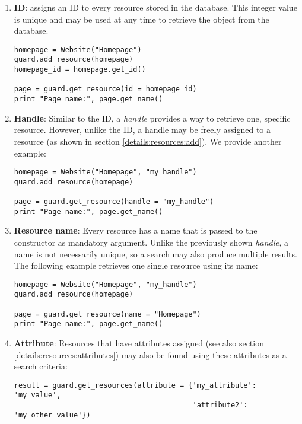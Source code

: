 \begin{enumerate}
\item {\bf ID}: \product assigns an ID to every resource stored in the 
database. This integer value is unique and may be used at any time to 
retrieve the object from the database.

\begin{lstlisting}
homepage = Website("Homepage")
guard.add_resource(homepage)
homepage_id = homepage.get_id()

page = guard.get_resource(id = homepage_id)
print "Page name:", page.get_name()
\end{lstlisting}

\item {\bf Handle}: Similar to the ID, a {\it handle} provides a way to 
retrieve one, specific resource. However, unlike the ID, a handle may be 
freely assigned to a resource (as shown in section 
\ref{details:resources:add}). We provide another example:

\begin{lstlisting}
homepage = Website("Homepage", "my_handle")
guard.add_resource(homepage)

page = guard.get_resource(handle = "my_handle")
print "Page name:", page.get_name()
\end{lstlisting}

\item {\bf Resource name}: Every resource has a name that is passed to 
the constructor as mandatory argument. Unlike the previously shown
{\it handle}, a name is not necessarily unique, so a search may also 
produce multiple results. The following example retrieves one single 
resource using its name:

\begin{lstlisting}
homepage = Website("Homepage", "my_handle")
guard.add_resource(homepage)

page = guard.get_resource(name = "Homepage")
print "Page name:", page.get_name()
\end{lstlisting}

\item {\bf Attribute}: Resources that have attributes assigned (see also 
section \ref{details:resources:attributes}) may also be found using these 
attributes as a search criteria:

\begin{lstlisting}
result = guard.get_resources(attribute = {'my_attribute': 'my_value',
                                          'attribute2':   'my_other_value'})
\end{lstlisting}


\end{enumerate}
